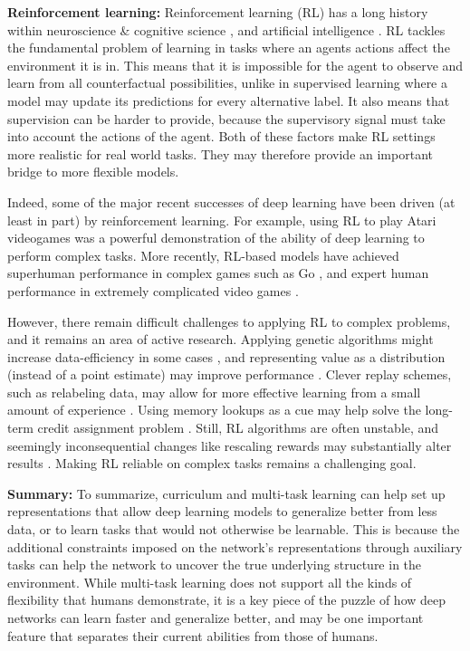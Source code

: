 \textbf{Reinforcement learning:} Reinforcement learning (RL) has a long history within neuroscience \& cognitive science \citep{Odoherty2003,Niv2009,Dabney2020}, and artificial intelligence \citep{Sutton2017}. RL tackles the fundamental problem of learning in tasks where an agents actions affect the environment it is in. This means that it is impossible for the agent to observe and learn from all counterfactual possibilities, unlike in supervised learning where a model may update its predictions for every alternative label. It also means that supervision can be harder to provide, because the supervisory signal must take into account the actions of the agent. Both of these factors make RL settings more realistic for real world tasks. They may therefore provide an important bridge to more flexible models.\par 
Indeed, some of the major recent successes of deep learning have been driven (at least in part) by reinforcement learning. For example, using RL to play Atari videogames \citep{Mnih2015} was a powerful demonstration of the ability of deep learning to perform complex tasks. More recently, RL-based models have achieved superhuman performance in complex games such as Go \citep{Silver2016,Silver2017}, and expert human performance in extremely complicated video games \citep{OpenAI2019,Vinyals2019}. \par
However, there remain difficult challenges to applying RL to complex problems, and it remains an area of active research. Applying genetic algorithms might increase data-efficiency in some cases \citep{Petroski2018}, and representing value as a distribution (instead of a point estimate) may improve performance \citep{Bellemare2017}. Clever replay schemes, such as relabeling data, may allow for more effective learning from a small amount of experience \citep{Andrychowicz2017}. Using memory lookups as a cue may help solve the long-term credit assignment problem \citep{Hung2019}. Still, RL algorithms are often unstable, and seemingly inconsequential changes like rescaling rewards may substantially alter results \citep{Henderson2018}. Making RL reliable on complex tasks remains a challenging goal. \par  

\textbf{Summary:} To summarize, curriculum and multi-task learning can help set up representations that allow deep learning models to generalize better from less data, or to learn tasks that would not otherwise be learnable. This is because the additional constraints imposed on the network's representations through auxiliary tasks can help the network to uncover the true underlying structure in the environment. While multi-task learning does not support all the kinds of flexibility that humans demonstrate, it is a key piece of the puzzle of how deep networks can learn faster and generalize better, and may be one important feature that separates their current abilities from those of humans. \par

